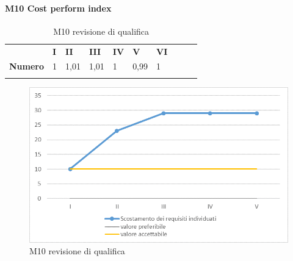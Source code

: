 \paragraph{M10 Cost perform index} \mbox{}
\begin{longtable}[H!] {						
		>{}p{50mm}  		
		>{}p{8mm}
		>{}p{8mm}		
		>{}p{8mm}		
		>{}p{8mm}		
		>{}p{8mm}		
		>{}p{8mm}
		>{}p{8mm}
		>{}p{8mm}
		>{}p{8mm}
	}
	\rowcolor{gray!50}
	\textbf{} & \textbf{I} & \textbf{II} & \textbf{III} & \textbf{IV} & \textbf{V} & \textbf{VI} \TBstrut \\ [2mm]
	\textbf{Numero} & 1 & 1,01 & 1,01 & 1 & 0,99 & 1 \TBstrut \\ [2mm]
	\rowcolor{white}
	\caption{M10 revisione di qualifica}
\end{longtable}
\begin{figure}[H] 	
	\includegraphics[width=\linewidth]{./img/grafici/RP1.png}	
	\caption{M10 revisione di qualifica}	
\end{figure}
